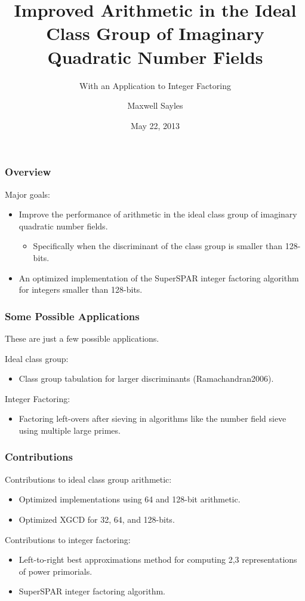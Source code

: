 \documentclass{beamer}
\title[]{Improved Arithmetic in the Ideal Class Group of Imaginary Quadratic Number Fields}
\subtitle{With an Application to Integer Factoring}
\author{Maxwell Sayles}
\date{May 22, 2013}
\institute{
	\bigskip 
       Department of Computer Science \\
       University of Calgary
}
\begin{document}
\maketitle

\begin{frame}
\frametitle{Overview}

Major goals:
\begin{itemize}
\item Improve the performance of arithmetic in the ideal class group of imaginary quadratic number fields.
	\begin{itemize}
	\item Specifically when the discriminant of the class group is smaller than 128-bits.
	\end{itemize}
\item An optimized implementation of the SuperSPAR integer factoring algorithm for integers smaller than 128-bits.
\end{itemize}

\end{frame}

\begin{frame}
\frametitle{Some Possible Applications}
These are just a few possible applications. \bigskip

Ideal class group:
\begin{itemize}
\item Class group tabulation for larger discriminants \break (Ramachandran2006).
\end{itemize}

\bigskip
Integer Factoring:
\begin{itemize}
\item Factoring left-overs after sieving in algorithms like the number field sieve using multiple large primes.
\end{itemize}

\end{frame}

\begin{frame}
\frametitle{Contributions}
Contributions to ideal class group arithmetic:
\begin{itemize} %
\item Optimized implementations using 64 and 128-bit arithmetic.
\item Optimized XGCD for 32, 64, and 128-bits.
\end{itemize}

\bigskip
Contributions to integer factoring:
\begin{itemize}
\item Left-to-right best approximations method for computing 2,3 representations of power primorials.
\item SuperSPAR integer factoring algorithm.
\end{itemize}
\end{frame}
\end{document}
